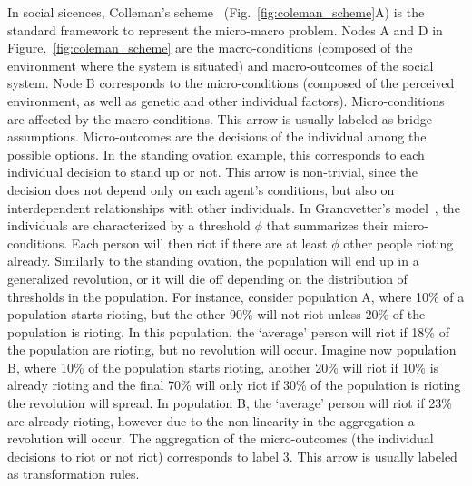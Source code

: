In social sicences, Colleman’s scheme~\citep{coleman1990} (Fig.~\ref{fig:coleman_scheme}A) is the standard framework to represent the micro-macro problem.
Nodes A and D in Figure.~\ref{fig:coleman_scheme} are the macro-conditions (composed of the environment where the system is situated) and macro-outcomes of the social system. 
Node B corresponds to the micro-conditions (composed of the perceived environment, as well as genetic and other individual factors). 
Micro-conditions are affected by the macro-conditions. 
This arrow is usually labeled as bridge assumptions.
Micro-outcomes are the decisions of the individual among the possible options. 
In the standing ovation example, this corresponds to each individual decision to stand up or not. 
This arrow is non-trivial, since the decision does not depend only on each agent's conditions, 
but also on interdependent relationships with other individuals.
In Granovetter's model~\cite{granovetter1978}, the individuals are characterized by a threshold $\phi$ that summarizes their micro-conditions. 
Each person will then riot if there are at least $\phi$ other people rioting already.
Similarly to the standing ovation, the population will end up in a generalized revolution, 
or it will die off depending on the distribution of thresholds in the population. 
For instance, consider population A, where 10\% of a population starts rioting, but the other 90\% will not riot unless 20\% of the population is rioting.
In this population, the `average' person will riot if 18\% of the population are rioting, but no revolution will occur.
Imagine now population B, where 10\% of the population starts rioting, another 20\% will riot if 10\% is already rioting and the final 70\% will only riot if 30\% of the population is rioting the revolution will spread. 
In population B, the `average' person will riot if 23\% are already rioting, however due to the non-linearity in the aggregation a revolution will occur.
The aggregation of the micro-outcomes (the individual decisions to riot or not riot) corresponds to label 3. This arrow is usually labeled as transformation rules.


